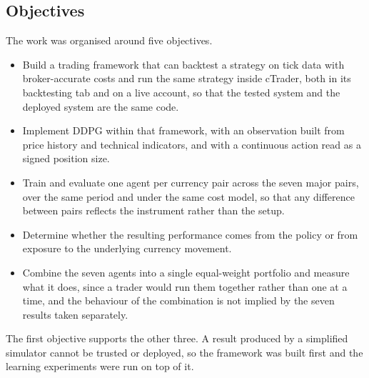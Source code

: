 \subsection{Objectives}

The work was organised around five objectives.

\begin{itemize}
\item Build a trading framework that can backtest a strategy on tick data with broker-accurate costs and run the same strategy inside cTrader, both in its backtesting tab and on a live account, so that the tested system and the deployed system are the same code.
\item Implement DDPG within that framework, with an observation built from price history and technical indicators, and with a continuous action read as a signed position size.
\item Train and evaluate one agent per currency pair across the seven major pairs, over the same period and under the same cost model, so that any difference between pairs reflects the instrument rather than the setup.
\item Determine whether the resulting performance comes from the policy or from exposure to the underlying currency movement.
\item Combine the seven agents into a single equal-weight portfolio and measure what it does, since a trader would run them together rather than one at a time, and the behaviour of the combination is not implied by the seven results taken separately.
\end{itemize}

The first objective supports the other three. A result produced by a simplified simulator cannot be trusted or deployed, so the framework was built first and the learning experiments were run on top of it.